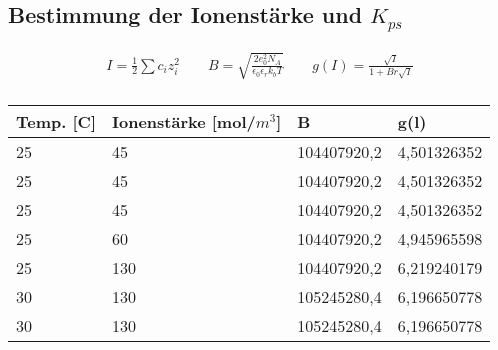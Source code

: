 
\subsection{Bestimmung der Ionenstärke und $K_{ps}$}

\begin{align*}
	I = \frac{1}{2} \sum c_i z_i^2 \qquad B = \sqrt{\frac{2 e_0^2 N_A}{\epsilon_0 \epsilon_r k_b T}} \qquad  g(I) = \frac{\sqrt{I}}{1 + B r \sqrt{I}} \\
\end{align*}

\begin{table}[H]
	\centering
	\begin{tabular}{llll}
		\toprule
		Temp. [C] & Ionenstärke [mol/$m^3$] & B           & g(l)        \\
		\midrule
		25        & 45                      & 104407920,2 & 4,501326352 \\
		25        & 45                      & 104407920,2 & 4,501326352 \\
		25        & 45                      & 104407920,2 & 4,501326352 \\
		25        & 60                      & 104407920,2 & 4,945965598 \\
		25        & 130                     & 104407920,2 & 6,219240179 \\
		30        & 130                     & 105245280,4 & 6,196650778 \\
		30        & 130                     & 105245280,4 & 6,196650778 \\
		\bottomrule
	\end{tabular}
\end{table}